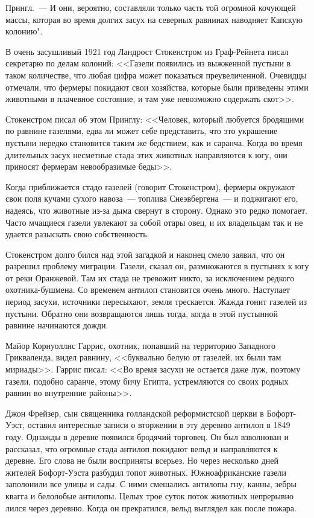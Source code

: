 \documentclass[12pt,a4paper,twoside,openany,svgnames]{memoir}
\begin{document}
Прингл.~--- И они, вероятно, составляли только часть той огромной кочующей массы, которая во время долгих засух на северных равнинах наводняет Капскую колонию".

В очень засушливый 1921 год Ландрост Стокенстром из Граф-Рейнета писал секретарю по делам колоний: <<Газели появились из выжженной пустыни в таком количестве, что любая цифра может показаться преувеличенной. Очевидцы отмечали, что фермеры покидают свои хозяйства, которые были приведены этими животными в плачевное состояние, и там уже невозможно содержать скот>>.

Стокенстром писал об этом Принглу: <<Человек, который любуется бродящими по равнине газелями, едва ли может себе представить, что это украшение пустыни нередко становится таким же бедствием, как и саранча. Когда во время длительных засух несметные стада этих животных направляются к югу, они приносят фермерам невообразимые беды>>.

Когда приближается стадо газелей (говорит Стокенстром), фермеры окружают свои поля кучами сухого навоза~--- топлива Снеэвбергена~--- и поджигают его, надеясь, что животные из-за дыма свернут в сторону. Однако это редко помогает. Часто мчащиеся газели увлекают за собой отары овец, и их владельцам так и не удается разыскать свою собственность.

Стокенстром долго бился над этой загадкой и наконец смело заявил, что он разрешил проблему миграции. Газели, сказал он, размножаются в пустынях к югу от реки Оранжевой. Там их стада не тревожит никто, за исключением редкого охотника-бушмена. Со временем антилоп становится очень много. Наступает период засухи, источники пересыхают, земля трескается. Жажда гонит газелей из пустыни. Обратно они возвращаются лишь тогда, когда в этой пустынной равнине начинаются дожди.

Майор Корнуоллис Гаррис, охотник, попавший на территорию Западного Грикваленда, видел равнину, <<буквально белую от газелей, их были там мириады>>. Гаррис писал: <<Во время засухи не остается даже луж, поэтому газели, подобно саранче, этому бичу Египта, устремляются со своих родных равнин во внутренние районы>>.

Джон Фрейзер, сын священника голландской реформистской церкви в Бофорт-Уэст, оставил интересные записи о вторжении в эту деревню антилоп в 1849 году. Однажды в деревне появился бродячий торговец. Он был взволнован и рассказал, что огромные стада антилоп покидают вельд и направляются к деревне. Его слова не были восприняты всерьез. Но через несколько дней жителей Бофорт-Уэста разбудил топот животных. Южноафриканские газели заполонили все улицы и сады. С ними смешались антилопы гну, канны, зебры квагга и белолобые антилопы. Целых трое суток поток животных непрерывно лился через деревню. Когда он прекратился, вельд выглядел как после пожара.
\end{document}
